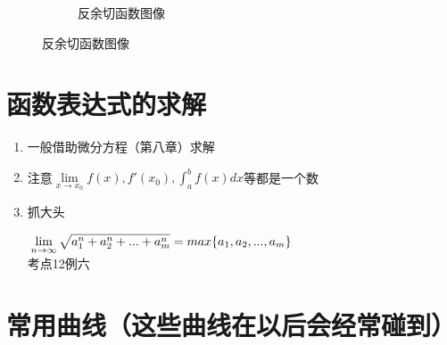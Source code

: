 \begin{enumerate}
\begin{enumerate}
\begin{enumerate}
\begin{figure}[H]
\begin{subfigure}{.475\linewidth}
            \end{subfigure}
            \begin{subfigure}{.475\linewidth}
            \caption{反余切函数图像}
            \end{subfigure}
            \end{figure}
            \end{enumerate}
    \end{enumerate}


\end{enumerate}

\section{函数表达式的求解}

\begin{enumerate}
    \item 一般借助微分方程（第八章）求解
    \item 注意$\lim \limits_{x\to x_0}f(x),f'(x_0),\int_{a}^{b}f(x)dx$等都是一个数
    \item 抓大头
    \begin{tcolorbox}
        \newline
        $\displaystyle\hspace{.2em}\lim \limits_{n\to \infty}\sqrt{a_1^n+a_2^n+...+a_m^n}=max\{a_1,a_2,...,a_m\}$\\
        考点12例六
    \end{tcolorbox}

\end{enumerate}

\section{常用曲线（这些曲线在以后会经常碰到）}

